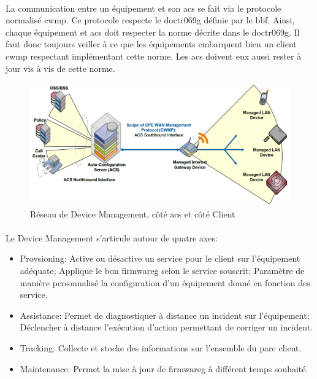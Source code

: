 \documentclass[12pt,a4paper]{report}
\begin{document}
\paragraph*{}
La communication entre un équipement et son \gls{acs} se fait via le protocole normalisé \gls{cwmp}. Ce protocole respecte le \gls{doctr069g} définie par le \gls{bbf}. Ainsi, chaque équipement et \gls{acs} doit respecter la norme décrite dans le \gls{doctr069g}. Il faut donc toujours veiller à ce que les équipements embarquent bien un client \gls{cwmp} respectant implémentant cette norme. Les \gls{acs}  doivent eux aussi rester à jour vis à vis de cette norme.
\begin{figure}[!ht]
    \center
    \includegraphics[scale=0.75]{./img/DM-TR-069-screen.png}
    \caption{Réseau de Device Management, côté \gls{acs} et côté Client}
\end{figure}
\paragraph*{}Le Device Management s'articule autour de quatre axes:
\begin{itemize}
\subparagraph*{}
\item Provsioning: Active ou désactive un service pour le client sur l'équipement adéquate; Applique le bon \gls{firmwareg} selon le service souscrit; Paramètre de manière personnalisé la configuration d'un équipement donné en fonction des service.
\item Assistance: Permet de diagnostiquer à distance un incident sur l'équipement; Déclencher à distance l'exécution d'action permettant de corriger un incident.
\item Tracking: Collecte et stocke des informations sur l'ensemble du parc client.
\item Maintenance: Permet la mise à jour de \gls{firmwareg} à différent temps souhaité.
\end{itemize}
\end{document}
